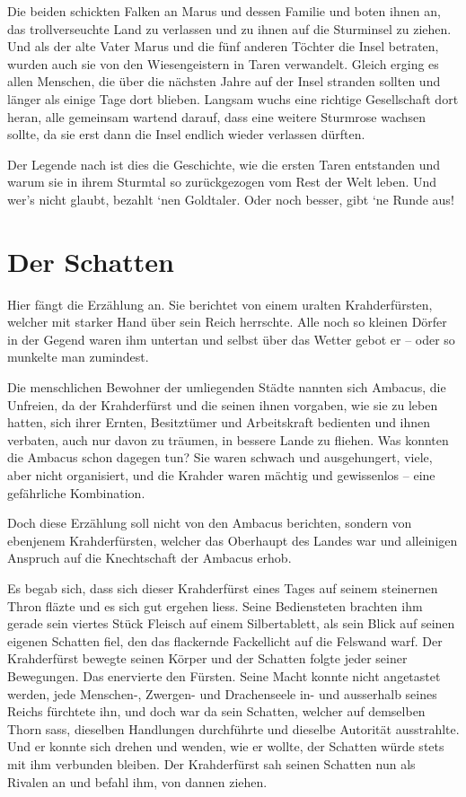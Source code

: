 \documentclass[10pt, a4paper, oneside]{book}
\begin{document}
Die beiden schickten Falken an Marus und dessen Familie und boten ihnen an, das trollverseuchte Land zu verlassen und zu ihnen auf die Sturminsel zu ziehen. Und als der alte Vater Marus und die fünf anderen Töchter die Insel betraten, wurden auch sie von den Wiesengeistern in Taren verwandelt. Gleich erging es allen Menschen, die über die nächsten Jahre auf der Insel stranden sollten und länger als einige Tage dort blieben. Langsam wuchs eine richtige Gesellschaft dort heran, alle gemeinsam wartend darauf, dass eine weitere Sturmrose wachsen sollte, da sie erst dann die Insel endlich wieder verlassen dürften.

Der Legende nach ist dies die Geschichte, wie die ersten Taren entstanden und warum sie in ihrem Sturmtal so zurückgezogen vom Rest der Welt leben. Und wer’s nicht glaubt, bezahlt `nen Goldtaler. Oder noch besser, gibt `ne Runde aus!





\newpage
\section{Der Schatten}



Hier fängt die Erzählung an. Sie berichtet von einem uralten Krahderfürsten, welcher mit starker Hand über sein Reich herrschte. Alle noch so kleinen Dörfer in der Gegend waren ihm untertan und selbst über das Wetter gebot er – oder so munkelte man zumindest.

Die menschlichen Bewohner der umliegenden Städte nannten sich Ambacus, die Unfreien, da der Krahderfürst und die seinen ihnen vorgaben, wie sie zu leben hatten, sich ihrer Ernten, Besitztümer und Arbeitskraft bedienten und ihnen verbaten, auch nur davon zu träumen, in bessere Lande zu fliehen. Was konnten die Ambacus schon dagegen tun? Sie waren schwach und ausgehungert, viele, aber nicht organisiert, und die Krahder waren mächtig und gewissenlos – eine gefährliche Kombination.

Doch diese Erzählung soll nicht von den Ambacus berichten, sondern von ebenjenem Krahderfürsten, welcher das Oberhaupt des Landes war und alleinigen Anspruch auf die Knechtschaft der Ambacus erhob.

Es begab sich, dass sich dieser Krahderfürst eines Tages auf seinem steinernen Thron fläzte und es sich gut ergehen liess. Seine Bediensteten brachten ihm gerade sein viertes Stück Fleisch auf einem Silbertablett, als sein Blick auf seinen eigenen Schatten fiel, den das flackernde Fackellicht auf die Felswand warf. Der Krahderfürst bewegte seinen Körper und der Schatten folgte jeder seiner Bewegungen. Das enervierte den Fürsten. Seine Macht konnte nicht angetastet werden, jede Menschen-, Zwergen- und Drachenseele in- und ausserhalb seines Reichs fürchtete ihn, und doch war da sein Schatten, welcher auf demselben Thorn sass, dieselben Handlungen durchführte und dieselbe Autorität ausstrahlte. Und er konnte sich drehen und wenden, wie er wollte, der Schatten würde stets mit ihm verbunden bleiben. Der Krahderfürst sah seinen Schatten nun als Rivalen an und befahl ihm, von dannen ziehen.
\end{document}
